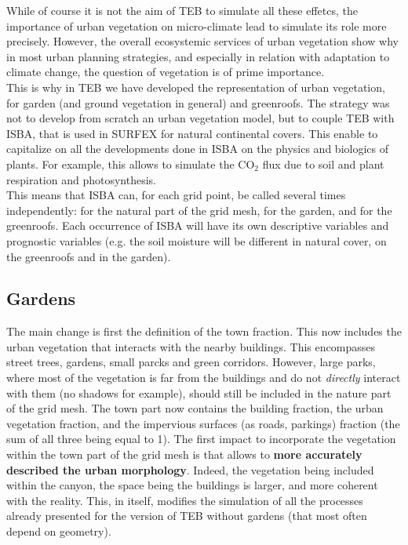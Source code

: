 While of course it is not the aim of TEB to simulate all these effetcs, the importance of urban vegetation on micro-climate lead to simulate its role more precisely. However, the overall ecosystemic services of urban vegetation show why in most urban planning strategies, and especially in relation with adaptation to climate change, the question of vegetation is of prime importance. \\

This is why in TEB we have developed the representation of urban vegetation, for garden (and ground vegetation in general) and greenroofs. The strategy was not to develop from scratch an urban vegetation model, but to couple TEB with ISBA, that is used in SURFEX for natural continental covers. This enable to capitalize on all the developments done in ISBA on the physics and biologics of plants. For example, this allows to simulate the CO$_2$ flux due to soil and plant respiration and photosynthesis. \\

This means that ISBA can, for each grid point, be called several times independently: for the natural part of the grid mesh, for the garden, and for the greenroofs. Each occurrence of ISBA will have its own descriptive variables and prognostic variables (e.g. the soil moisture will be different in natural cover, on the greenroofs and in the garden). \\

\subsection{Gardens}

The main change is first the definition of the town fraction. This now includes the urban vegetation that interacts with the nearby buildings. This encompasses street trees, gardens, small parcks and green corridors. However, large parks, where most of the vegetation is far from the buildings and do not {\it directly} interact with them (no shadows for example), should still be included in the nature part of the grid mesh. The town part now contains the building fraction, the urban vegetation fraction, and the impervious surfaces (as roads, parkings) fraction (the sum of all three being equal to 1). The first impact to incorporate the vegetation within the town part of the grid mesh is that allows to {\bf more accurately described the urban morphology}. Indeed, the vegetation being included within the canyon, the space being the buildings is larger, and more coherent with the reality. This, in itself, modifies the simulation of all the processes already presented for the version of TEB without gardens (that most often depend on geometry). \\

